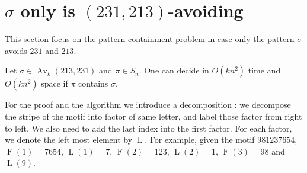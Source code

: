 \documentclass[a4paper]{llncs}
\DeclareMathOperator{\AV}{Av}
\DeclareMathOperator{\firsta}{L}
\newcommand{\first}[1]{\firsta({#1})}
\DeclareMathOperator{\factora}{F}
\newcommand{\factor}[1]{\factora({#1})}
\begin{document}

\section{$\sigma$ only is $(231,213)$-avoiding}	
\label{section:sigma only avoid 231 and 213}

This section focus on the pattern containment problem 
in case only the pattern $\sigma$ avoids $231$ and $213$.

\begin{proposition}
	\label{Proposition:sigma avoids 213 and 231}
	Let $\sigma \in \AV_k(213,231)$ and $\pi \in S_n$.
	One can decide in $O(kn^2)$ time
	and $O(kn^2)$ space if $\pi$ contains $\sigma$.
\end{proposition}

For the proof and the algorithm we introduce a decomposition : we decompose the stripe of the motif into factor of same letter, and label those factor from right to left. We also need to add the last index into the first factor. For each factor, we denote the left most element by $\firsta$. For example, given the motif $981237654$, $\factor{1} =7654$, $\first{1}=7$, $\factor{2}=123$, $\first{2}=1$, $\factor{3}=98$ and $\first{9}$.
			
\end{document}
